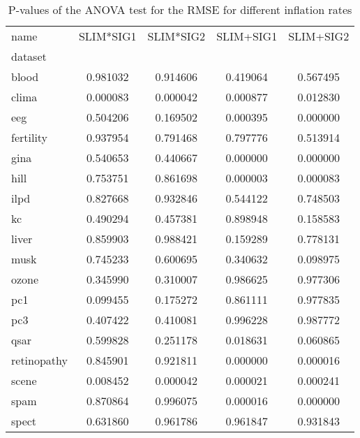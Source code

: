 
    \begin{table}[h]
        \centering
        \renewcommand{\arraystretch}{1.2}
        \begin{tabular}{lcccc}
\toprule
name & SLIM*SIG1 & SLIM*SIG2 & SLIM+SIG1 & SLIM+SIG2 \\
dataset &  &  &  &  \\
\midrule
blood & 0.981032 & 0.914606 & 0.419064 & 0.567495 \\
clima & 0.000083 & 0.000042 & 0.000877 & 0.012830 \\
eeg & 0.504206 & 0.169502 & 0.000395 & 0.000000 \\
fertility & 0.937954 & 0.791468 & 0.797776 & 0.513914 \\
gina & 0.540653 & 0.440667 & 0.000000 & 0.000000 \\
hill & 0.753751 & 0.861698 & 0.000003 & 0.000083 \\
ilpd & 0.827668 & 0.932846 & 0.544122 & 0.748503 \\
kc & 0.490294 & 0.457381 & 0.898948 & 0.158583 \\
liver & 0.859903 & 0.988421 & 0.159289 & 0.778131 \\
musk & 0.745233 & 0.600695 & 0.340632 & 0.098975 \\
ozone & 0.345990 & 0.310007 & 0.986625 & 0.977306 \\
pc1 & 0.099455 & 0.175272 & 0.861111 & 0.977835 \\
pc3 & 0.407422 & 0.410081 & 0.996228 & 0.987772 \\
qsar & 0.599828 & 0.251178 & 0.018631 & 0.060865 \\
retinopathy & 0.845901 & 0.921811 & 0.000000 & 0.000016 \\
scene & 0.008452 & 0.000042 & 0.000021 & 0.000241 \\
spam & 0.870864 & 0.996075 & 0.000016 & 0.000000 \\
spect & 0.631860 & 0.961786 & 0.961847 & 0.931843 \\
\bottomrule
\end{tabular}

        \caption{P-values of the ANOVA test for the RMSE for different inflation rates}
        \label{tab:anova_rmse}
    \end{table}
    
